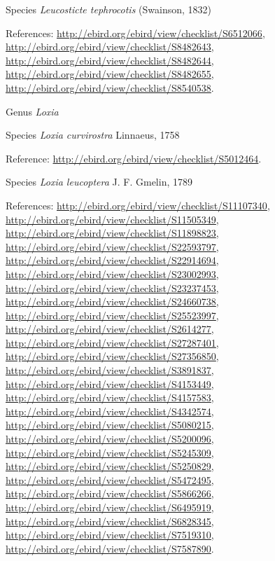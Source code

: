 \documentclass[9pt, article]{memoir}
\begin{document}
\begin{multicols}{2}
\vspace{6pt}\noindent\hspace{36pt}Species \textit{Leucosticte tephrocotis} (Swainson, 1832)


\vspace{6pt}References: 
\url{http://ebird.org/ebird/view/checklist/S6512066}, 
\url{http://ebird.org/ebird/view/checklist/S8482643}, 
\url{http://ebird.org/ebird/view/checklist/S8482644}, 
\url{http://ebird.org/ebird/view/checklist/S8482655}, 
\url{http://ebird.org/ebird/view/checklist/S8540538}.

\vspace{6pt}\noindent\hspace{30pt}Genus \textit{Loxia}


\vspace{6pt}\noindent\hspace{36pt}Species \textit{Loxia curvirostra} Linnaeus, 1758


\vspace{6pt}Reference: 
\url{http://ebird.org/ebird/view/checklist/S5012464}.

\vspace{6pt}\noindent\hspace{36pt}Species \textit{Loxia leucoptera} J. F. Gmelin, 1789


\vspace{6pt}References: 
\url{http://ebird.org/ebird/view/checklist/S11107340}, 
\url{http://ebird.org/ebird/view/checklist/S11505349}, 
\url{http://ebird.org/ebird/view/checklist/S11898823}, 
\url{http://ebird.org/ebird/view/checklist/S22593797}, 
\url{http://ebird.org/ebird/view/checklist/S22914694}, 
\url{http://ebird.org/ebird/view/checklist/S23002993}, 
\url{http://ebird.org/ebird/view/checklist/S23237453}, 
\url{http://ebird.org/ebird/view/checklist/S24660738}, 
\url{http://ebird.org/ebird/view/checklist/S25523997}, 
\url{http://ebird.org/ebird/view/checklist/S2614277}, 
\url{http://ebird.org/ebird/view/checklist/S27287401}, 
\url{http://ebird.org/ebird/view/checklist/S27356850}, 
\url{http://ebird.org/ebird/view/checklist/S3891837}, 
\url{http://ebird.org/ebird/view/checklist/S4153449}, 
\url{http://ebird.org/ebird/view/checklist/S4157583}, 
\url{http://ebird.org/ebird/view/checklist/S4342574}, 
\url{http://ebird.org/ebird/view/checklist/S5080215}, 
\url{http://ebird.org/ebird/view/checklist/S5200096}, 
\url{http://ebird.org/ebird/view/checklist/S5245309}, 
\url{http://ebird.org/ebird/view/checklist/S5250829}, 
\url{http://ebird.org/ebird/view/checklist/S5472495}, 
\url{http://ebird.org/ebird/view/checklist/S5866266}, 
\url{http://ebird.org/ebird/view/checklist/S6495919}, 
\url{http://ebird.org/ebird/view/checklist/S6828345}, 
\url{http://ebird.org/ebird/view/checklist/S7519310}, 
\url{http://ebird.org/ebird/view/checklist/S7587890}.


\end{multicols}
\end{document}
